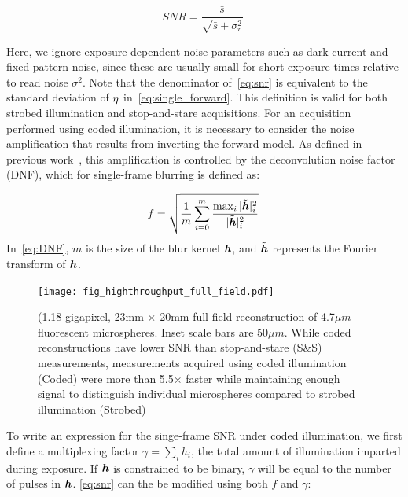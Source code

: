\begin{equation}
    \label{eq:snr}
    SNR = \frac{\bar{s}}{\sqrt{\bar{s} + \sigma^2_{r}}}\;
\end{equation}

Here, we ignore exposure-dependent noise parameters such as dark current and fixed-pattern noise, since these are usually small for short exposure times relative to read noise $\sigma^2$. Note that the denominator of~\eqref{eq:snr} is equivalent to the standard deviation of ${\eta}$ in~\eqref{eq:single_forward}. This definition is valid for both strobed illumination and stop-and-stare acquisitions. For an acquisition performed using coded illumination, it is necessary to consider the noise amplification that results from inverting the forward model. As defined in previous work~\cite{agrawal2009optimal}, this amplification is controlled by the deconvolution noise factor (DNF), which for single-frame blurring is defined as:

\begin{equation} \label{eq:DNF}
f = \sqrt{\frac{1}{m} \sum_{i=0}^m \frac{\max_i{|\tilde{\bm{h}}|_i^2}}{|\tilde{\bm{h}}|_i^2}}\:
\end{equation}
In~\eqref{eq:DNF}, $m$ is the size of the blur kernel $\bm{h}$, and $\tilde{\bm{h}}$ represents the Fourier transform of $\bm{h}$. %


\begin{figure}
  \centering
    \texttt{[image: fig\_highthroughput\_full\_field.pdf]}
    
  \caption{(1.18 gigapixel, 23mm $\times$ 20mm full-field reconstruction of 4.7$\mu m$ fluorescent microspheres. Inset scale bars are 50$\mu m$. While coded reconstructions have lower SNR than stop-and-stare (S\&S) measurements, measurements acquired using coded illumination (Coded) were more than 5.5$\times$ faster while maintaining enough signal to distinguish individual microspheres compared to strobed illumination (Strobed)}

\end{figure}

To write an expression for the singe-frame SNR under coded illumination, we first define a multiplexing factor $\gamma=\sum_{i} h_i$, the total amount of illumination imparted during exposure. If $\bm{h}$ is constrained to be binary, $\gamma$ will be equal to the number of pulses in $\bm{h}$. \eqref{eq:snr} can the be modified using both $f$ and $\gamma$:

